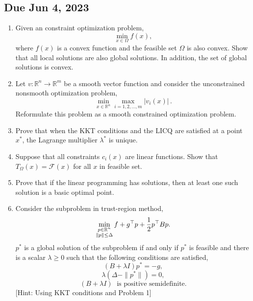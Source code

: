 \subsection*{Due Jun 4, 2023}
\begin{enumerate}[label=\textbf{Problem \arabic*.}]
    \item [20 pt] Given an constraint optimization problem,
    \[\min_{x\in\Omega}f(x),\]
    where \(f(x)\) is a convex function and the feasible set \(\Omega\) is also convex. Show that all local solutions are also global solutions. In addition, the set of global solutions is convex.
    \item [15 pt] Let \(v:\mathbb{R}^{n}\to\mathbb{R}^{m}\) be a smooth vector function and consider the unconstrained nonsmooth optimization problem,
    \[\min_{x\in\mathbb{R}^{n}}\max_{i=1,2,\ldots,m}|v_{i}(x)|\,.\]
    Reformulate this problem as a smooth constrained optimization problem.
    \item [15 pt] Prove that when the KKT conditions and the LICQ are satisfied at a point \(x^{*}\), the Lagrange multiplier \(\lambda^{*}\) is unique.
    \item [20 pt] Suppose that all constraints \(c_{i}(x)\) are linear functions. Show that \(T_{\Omega}(x)=\mathcal{F}(x)\) for all \(x\) in feasible set.
    \item [20 pt] Prove that if the linear programming has solutions, then at least one such solution is a basic optimal point.
    \item [0 pt] Consider the subproblem in trust-region method,
    \[\min_{\begin{subarray}{c}p\in\mathbb{R}^{n}\\ \|p\|\leq\Delta\end{subarray}}f+g^{\top}p+\frac{1}{2}p^{\top}Bp.\]
    \(p^{*}\) is a global solution of the subproblem if and only if \(p^{*}\) is feasible and there is a scalar \(\lambda\geq 0\) such that the following conditions are satisfied,
    \[(B+\lambda I)p^{*}=-g,\] \[\lambda(\Delta-\|p^{*}\|)= 0,\] \[(B+\lambda I)\;\text{ is positive semidefinite.}\]
    [Hint: Using KKT conditions and Problem 1]
\end{enumerate}